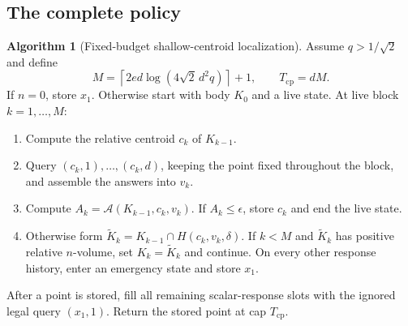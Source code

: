 \documentclass[11pt]{article}
\numberwithin{equation}{section}
\theoremstyle{definition}
\newtheorem{algorithm}[algorithm]{Algorithm}
\theoremstyle{remark}
\newcommand{\eps}{\epsilon}
\begin{document}
\subsection{The complete policy}

\begin{algorithm}[Fixed-budget shallow-centroid localization]\label{alg:centroid}
Assume $q>1/\sqrt2$ and define
\begin{equation}\label{eq:cp-budget}
M=\left\lceil2ed\log(4\sqrt2\,d^2q)\right\rceil+1,
\qquad T_{\mathrm{cp}}=dM.
\end{equation}
If $n=0$, store $x_1$. Otherwise start with body $K_0$ and a live state. At live block $k=1,\ldots,M$:
\begin{enumerate}[label=\arabic*.]
\item Compute the relative centroid $c_k$ of $K_{k-1}$.
\item Query $(c_k,1),\ldots,(c_k,d)$, keeping the point fixed throughout the block, and assemble the answers into $v_k$.
\item Compute $A_k=\mathcal A(K_{k-1},c_k,v_k)$. If $A_k\le\eps$, store $c_k$ and end the live state.
\item Otherwise form $\widetilde K_k=K_{k-1}\cap H(c_k,v_k,\delta)$. If $k<M$ and $\widetilde K_k$ has positive relative $n$-volume, set $K_k=\widetilde K_k$ and continue. On every other response history, enter an emergency state and store $x_1$.
\end{enumerate}
After a point is stored, fill all remaining scalar-response slots with the ignored legal query $(x_1,1)$. Return the stored point at cap $T_{\mathrm{cp}}$.
\end{algorithm}
\end{document}
